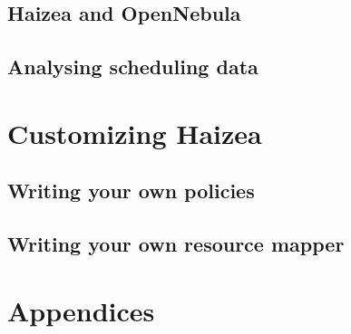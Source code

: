 \documentclass[11pt,oneside]{scrbook}
\begin{document}
\chapter{Haizea and OpenNebula}
\label{chap:opennebula}


\chapter{Analysing scheduling data}
\label{chap:analysing}



\part{Customizing Haizea}

\chapter{Writing your own policies}
\label{chap:policies}



\chapter{Writing your own resource mapper}
\label{mapper}






\part{Appendices}
\appendix
\end{document}
